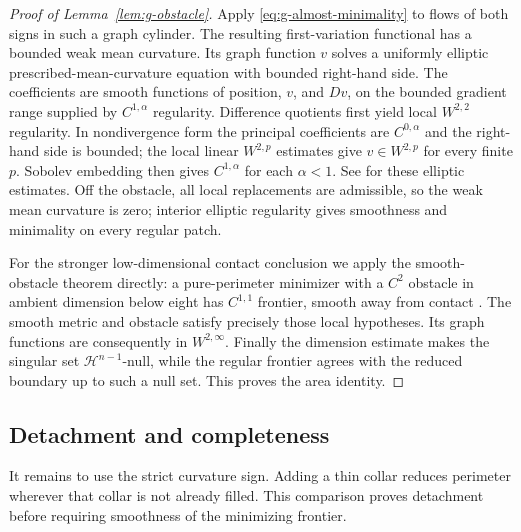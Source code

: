 \begin{proof}[Proof of Lemma~\ref{lem:g-obstacle}]
Apply \eqref{eq:g-almost-minimality} to flows of both signs in such a
graph cylinder.  The resulting first-variation functional has a
bounded weak mean curvature.  Its graph function $v$ solves a
uniformly elliptic prescribed-mean-curvature equation with bounded
right-hand side.  The coefficients are smooth functions of position,
$v$, and $Dv$, on the bounded gradient range supplied by
$C^{1,\alpha}$ regularity.  Difference quotients first yield local
$W^{2,2}$ regularity.  In nondivergence form the principal coefficients
are $C^{0,\alpha}$ and the right-hand side is bounded; the local
linear $W^{2,p}$ estimates give $v\in W^{2,p}$ for every finite $p$.
Sobolev embedding then gives $C^{1,\alpha}$ for each $\alpha<1$.
See \cite[Chapter~9]{GilbargTrudinger} for these elliptic estimates.
Off the obstacle, all local replacements are admissible, so the weak
mean curvature is zero; interior elliptic regularity gives
smoothness and minimality on every regular patch.

For the stronger low-dimensional contact conclusion we apply the
smooth-obstacle theorem directly: a pure-perimeter minimizer with a
$C^2$ obstacle in ambient dimension below eight has $C^{1,1}$
frontier, smooth away from contact
\cite[Regularity Theorem~1.3(iii), pp.~368--369]{HuiskenIlmanen2001}.
The smooth metric and obstacle satisfy precisely those local
hypotheses.  Its graph functions are consequently in
$W^{2,\infty}$.  Finally the dimension estimate makes the singular
set $\mathcal H^{n-1}$-null, while the regular frontier agrees with
the reduced boundary up to such a null set.  This proves the area
identity.
\end{proof}

\subsection{Detachment and completeness}
\label{subsec:g-proof-detachment}

It remains to use the strict curvature sign. Adding a thin collar
reduces perimeter wherever that collar is not already filled. This
comparison proves detachment before requiring smoothness of the
minimizing frontier.


